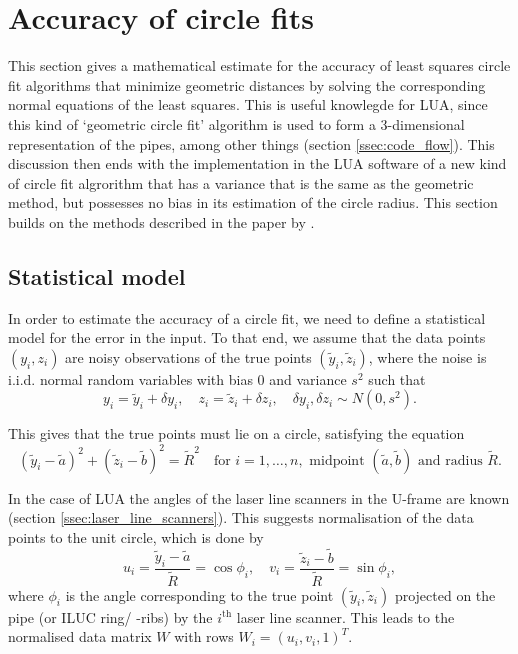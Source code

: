 \section{Accuracy of circle fits} \label{sec:accuracy}
This section gives a mathematical estimate for the accuracy of least squares circle fit algorithms that minimize geometric distances by solving the corresponding normal equations of the least squares. This is useful knowlegde for LUA, since this kind of `geometric circle fit' algorithm is used to form a 3-dimensional representation of the pipes, among other things (section \ref{ssec:code_flow}). This discussion then ends with the implementation in the LUA software of a new kind of circle fit algrorithm that has a variance that is the same as the geometric method, but possesses no bias in its estimation of the circle radius. This section builds on the methods described in the paper by \citeauthor{alsharadqah_chernov_circle_fitting} \cite{alsharadqah_chernov_circle_fitting}.

\subsection{Statistical model}\label{ssec:statistical_model}
In order to estimate the accuracy of a circle fit, we need to define a statistical model for the error in the input. To that end, we assume that the data points $(y_i, z_i)$ are noisy observations of the true points $(\tilde{y}_i, \tilde{z}_i)$, where the noise is i.i.d. normal random variables with bias 0 and variance $s^2$ \cite[section 2]{alsharadqah_chernov_circle_fitting} such that
\begin{equation}
    y_i = \tilde{y}_i + \delta y_i, \quad z_i = \tilde{z}_i + \delta z_i, \quad \delta y_i, \delta z_i \sim N(0, s^2).
\end{equation}

This gives that the true points must lie on a circle, satisfying the equation
\begin{equation}
    (\tilde{y}_i - \tilde{a})^2 + (\tilde{z}_i - \tilde{b})^2 = \tilde{R}^2 \quad \text{for } i = 1, \dots, n, \text{ midpoint } (\tilde{a}, \tilde{b}) \text{ and radius } \tilde{R}.
\end{equation}

In the case of LUA the angles of the laser line scanners in the U-frame are known (section \ref{ssec:laser_line_scanners}). This suggests normalisation of the data points to the unit circle, which is done by
\begin{equation}
    u_i = \frac{\tilde{y}_i - \tilde{a}}{\tilde{R}} = \cos{\phi_i}, \quad v_i = \frac{\tilde{z}_i - \tilde{b}}{\tilde{R}} = \sin{\phi_i},
\end{equation}
where $\phi_i$ is the angle corresponding to the true point $(\tilde{y}_i, \tilde{z}_i)$ projected on the pipe (or ILUC ring/ -ribs) by the $i^{\text{th}}$ laser line scanner. This leads to the normalised data matrix $W$ with rows $W_i = (u_i, v_i, 1)^T$.

